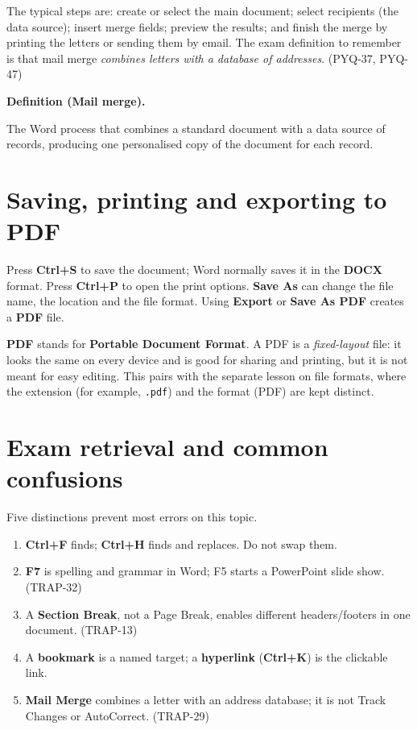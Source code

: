 \documentclass[11pt]{article}
\newenvironment{definitionbox}[1]{%
  \par\noindent\textbf{Definition (#1).}\ \itshape
}{\par\vspace{0.3em}}
\begin{document}
The typical steps are: create or select the main document; select recipients
(the data source); insert merge fields; preview the results; and finish the
merge by printing the letters or sending them by email. The exam definition to
remember is that mail merge \emph{combines letters with a database of
addresses}. (PYQ-37, PYQ-47)

\begin{definitionbox}{Mail merge}
The Word process that combines a standard document with a data source of
records, producing one personalised copy of the document for each record.
\end{definitionbox}

\section{Saving, printing and exporting to PDF}
Press \textbf{Ctrl+S} to save the document; Word normally saves it in the
\textbf{DOCX} format. Press \textbf{Ctrl+P} to open the print options.
\textbf{Save As} can change the file name, the location and the file format.
Using \textbf{Export} or \textbf{Save As PDF} creates a \textbf{PDF} file.

\textbf{PDF} stands for \textbf{Portable Document Format}. A PDF is a
\emph{fixed-layout} file: it looks the same on every device and is good for
sharing and printing, but it is not meant for easy editing. This pairs with the
separate lesson on file formats, where the extension (for example,
\texttt{.pdf}) and the format (PDF) are kept distinct.

\section{Exam retrieval and common confusions}
Five distinctions prevent most errors on this topic.
\begin{enumerate}
  \item \textbf{Ctrl+F} finds; \textbf{Ctrl+H} finds and replaces. Do not swap
    them.
  \item \textbf{F7} is spelling and grammar in Word; F5 starts a PowerPoint
    slide show. (TRAP-32)
  \item A \textbf{Section Break}, not a Page Break, enables different
    headers/footers in one document. (TRAP-13)
  \item A \textbf{bookmark} is a named target; a \textbf{hyperlink}
    (\textbf{Ctrl+K}) is the clickable link.
  \item \textbf{Mail Merge} combines a letter with an address database; it is
    not Track Changes or AutoCorrect. (TRAP-29)
\end{enumerate}
\end{document}
